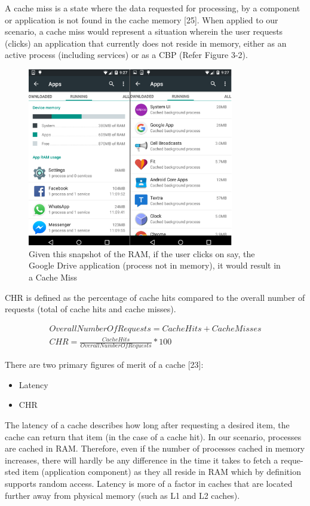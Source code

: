 \documentclass[12pt]{uthesis-v12}  %
\begin{document}
			A cache miss is a state where the data requested for processing, by a component or application is not found in the cache memory [25]. When applied to our scenario, a cache miss would represent a situation wherein the user requests (clicks) an application that currently does not reside in memory, either as an active process (including services) or as a CBP (Refer Figure 3-2).
			
			\begin{figure}[!ht]
				\centering
				\includegraphics[width = 90mm]{images/runningApps.png}
				\caption[Running Apps and CBP(s) - Cache Miss]
				{Given this snapshot of the RAM, if the user clicks on say, the Google Drive application (process not in memory), it would result in a Cache Miss}
			\end{figure}		
			
			CHR is defined as the percentage of cache hits compared to the overall number of requests (total of cache hits and cache misses).
			
			\begin{eqnarray}
				Overall Number Of Requests = Cache Hits + Cache Misses \label{Total Requests} \\
				CHR = \frac{Cache Hits}{Overall Number Of Requests} * 100 \label{CHR}
			\end{eqnarray}
			
			There are two primary figures of merit of a cache [23]:
			
			\begin{itemize}
				\item Latency
				\item CHR
			\end{itemize}
			
			The latency of a cache describes how long after requesting a desired item, the cache can return that item (in the case of a cache hit). In our scenario, processes are cached in RAM. Therefore, even if the number of processes cached in memory increases, there will hardly be any difference in the time it takes to fetch a reque-sted item (application component) as they all reside in RAM which by definition supports random access. Latency is more of a factor in caches that are located further away from physical memory (such as L1 and L2 caches).
			
\end{document}

